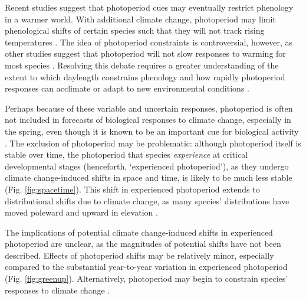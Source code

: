 \documentclass{article}
\begin{document}
\par Recent studies suggest that photoperiod cues may eventually restrict phenology in a warmer world. With additional climate change, photoperiod may limit phenological shifts of certain species such that they will not track rising temperatures \citep{fu2015,way2015,Basler:2012,koerner2010a}. The idea of photoperiod constraints is controversial, however, as other studies suggest that photoperiod will not slow responses to warming for most species \citep{chuine2010,zohner2016}. Resolving this debate requires a greater understanding of the extent to which daylength constrains phenology and how rapidly photoperiod responses can acclimate or adapt to new environmental conditions \citep{grevstad2015}.

\par Perhaps because of these variable and uncertain responses, photoperiod is often not included in forecasts of biological responses to climate change, especially in the spring, even though it is known to be an important cue for biological activity \citep[but see ][]{duputie2015,grevstad2015,Caffarra:2011qf}. The exclusion of photoperiod may be problematic: although photoperiod itself is stable over time, the photoperiod that species \emph{experience} at critical developmental stages (henceforth, `experienced photoperiod'), as they undergo climate change-induced shifts in space and time, is likely to be much less stable (Fig. \ref{fig:spacetime}). This shift in experienced photoperiod extends to distributional shifts due to climate change, as many species' distributions have moved poleward and upward in elevation \citep[i.e., range shifts,][]{chen2011,harsch2009,parmesan2006,penuelas2003}. %

\par The implications of potential climate change-induced shifts in experienced photoperiod are unclear, as the magnitudes of potential shifts have not been described. Effects of photoperiod shifts may be relatively minor, especially compared to the substantial year-to-year variation in experienced photoperiod (Fig. \ref{fig:greenup}). Alternatively, photoperiod may begin to constrain species' responses to climate change \citep{huffeldt2020,fu2015,way2015,Basler:2012,koerner2010a}.
\end{document}
